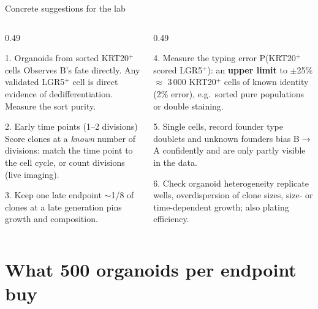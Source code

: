 \documentclass[aspectratio=169,11pt]{beamer}
\newcommand{\BA}{B$\to$A}
\begin{document}
\begin{frame}{Concrete suggestions for the lab}
\begin{columns}[T]
\begin{column}{0.49\textwidth}
\begin{block}{1. Organoids from sorted KRT20$^+$ cells}
\footnotesize Observes B's fate directly. Any validated LGR5$^+$ cell is direct evidence of dedifferentiation. Measure the sort purity.
\end{block}
\begin{block}{2. Early time points (1--2 divisions)}
\footnotesize Score clones at a \emph{known} number of divisions: match the time point to the cell cycle, or count divisions (live imaging).
\end{block}
\begin{block}{3. Keep one late endpoint}
\footnotesize $\sim$1/8 of clones at a late generation pins growth and composition.
\end{block}
\end{column}
\begin{column}{0.49\textwidth}
\begin{alertblock}{4. Measure the typing error}
\footnotesize P(KRT20$^+$ scored LGR5$^+$): an \textbf{upper limit} to $\pm$25\% $\approx$ 3\,000 KRT20$^+$ cells of known identity (2\% error), e.g.\ sorted pure populations or double staining.
\end{alertblock}
\begin{block}{5. Single cells, record founder type}
\footnotesize doublets and unknown founders bias \BA{} confidently and are only partly visible in the data.
\end{block}
\begin{block}{6. Check organoid heterogeneity}
\footnotesize replicate wells, overdispersion of clone sizes, size- or time-dependent growth; also plating efficiency.
\end{block}
\end{column}
\end{columns}
\end{frame}

\section{What 500 organoids per endpoint buy}
\end{document}
